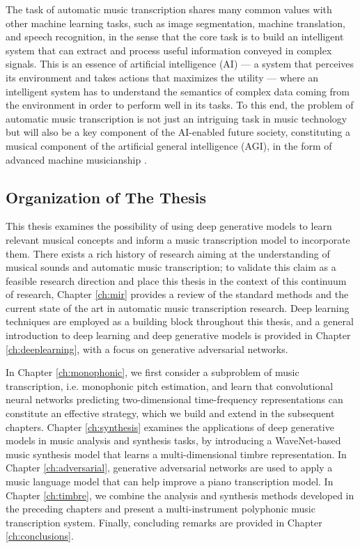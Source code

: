 The task of automatic music transcription shares many common values with other machine learning tasks, such as image segmentation, machine translation, and speech recognition, in the sense that the core task is to build an intelligent system that can extract and process useful information conveyed in complex signals.
This is an essence of artificial intelligence (AI)
--- a system that perceives its environment and takes actions that maximizes the utility \cite{russell2009ai} --- 
where an intelligent system has to understand the semantics of complex data coming from the environment in order to perform well in its tasks.
To this end, the problem of automatic music transcription is not just an intriguing task in music technology but will also be a key component of the AI-enabled future society, constituting a musical component of the artificial general intelligence (AGI), in the form of advanced machine musicianship \cite{rowe2003musicianship}.


\subsection{Organization of The Thesis}


This thesis examines the possibility of using deep generative models to learn relevant musical concepts and inform a music transcription model to incorporate them.
There exists a rich history of research aiming at the understanding of musical sounds and automatic music transcription; to validate this claim as a feasible research direction and place this thesis in the context of this continuum of research, Chapter \ref{ch:mir} provides a review of the standard methods and the current state of the art in automatic music transcription research.
Deep learning techniques are employed as a building block throughout this thesis, and a general introduction to deep learning and deep generative models is provided in Chapter \ref{ch:deeplearning}, with a focus on generative adversarial networks.

In Chapter \ref{ch:monophonic}, we first consider a subproblem of music transcription, i.e. monophonic pitch estimation, and learn that convolutional neural networks predicting two-dimensional time-frequency representations can constitute an effective strategy, which we build and extend in the subsequent chapters.
Chapter \ref{ch:synthesis} examines the applications of deep generative models in music analysis and synthesis tasks, by introducing a WaveNet-based music synthesis model that learns a multi-dimensional timbre representation.
In Chapter \ref{ch:adversarial}, generative adversarial networks are used to apply a music language model that can help improve a piano transcription model.
In Chapter \ref{ch:timbre}, we combine the analysis and synthesis methods developed in the preceding chapters and present a multi-instrument polyphonic music transcription system.
Finally, concluding remarks are provided in Chapter \ref{ch:conclusions}.


